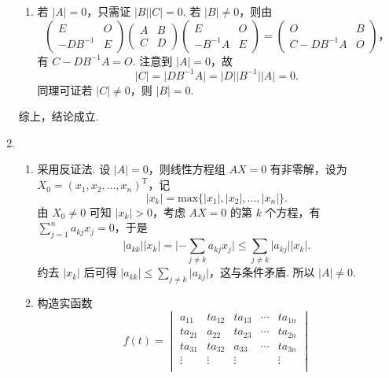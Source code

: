 \begin{enumerate}
\begin{enumerate}
        \item 若 $\lvert A \rvert = 0$，只需证 $\lvert B \rvert \lvert C \rvert = 0$. 若 $\lvert B \rvert \neq 0$，则由 \[\begin{pmatrix}
            E & O \\
            -DB^{-1} & E
        \end{pmatrix} \begin{pmatrix}
            A & B \\
            C & D
        \end{pmatrix} \begin{pmatrix}
            E & O \\
            -B^{-1}A & E
        \end{pmatrix} = \begin{pmatrix}
            O & B \\
            C-DB^{-1}A & O
        \end{pmatrix}，\] 有 $C-DB^{-1}A = O$. 注意到 $\lvert A \rvert = 0$，故 \[\lvert C \rvert = \lvert DB^{-1}A \rvert = \lvert D \rvert \lvert B^{-1} \rvert \lvert A \rvert = 0.\] 同理可证若 $\lvert C \rvert \neq 0$，则 $\lvert B \rvert = 0$.
    \end{enumerate}
    综上，结论成立.
    \item \begin{enumerate}
        \item 采用反证法. 设 $\lvert A \rvert = 0$，则线性方程组 $AX = 0$ 有非零解，设为 $X_0 = (x_1, x_2, \ldots, x_n)^{\mathrm{T}}$，记 \[\lvert x_k \rvert = \mathrm{max} \{\lvert x_1 \rvert, \lvert x_2 \rvert, \ldots, \lvert x_n \rvert\}.\] 由 $X_0 \neq 0$ 可知 $\lvert x_k \rvert > 0$，考虑 $AX = 0$ 的第 $k$ 个方程，有 $\sum_{j=1}^n a_{kj}x_j = 0$，于是 \[\lvert a_{kk} \rvert \lvert x_k \rvert = \lvert -\sum_{j \neq k}a_{kj}x_j \rvert \leqslant \sum_{j \neq k}\lvert a_{kj} \rvert \lvert x_k \rvert.\] 约去 $\lvert x_k \rvert$ 后可得 $\lvert a_{kk} \rvert \leqslant \sum_{j \neq k} \lvert a_{kj} \rvert$，这与条件矛盾. 所以 $\lvert A \rvert \neq 0$.
        \item 构造实函数 \[f(t) = \begin{vmatrix}
            a_{11} & ta_{12} & ta_{13} & \cdots & ta_{1n} \\
            ta_{21} & a_{22} & ta_{23} & \cdots & ta_{2n} \\
            ta_{31} & ta_{32} & a_{33} & \cdots & ta_{3n} \\
            \vdots & \vdots & \vdots &          & \vdots \\

\end{vmatrix}\]
\end{enumerate}
\end{enumerate}
